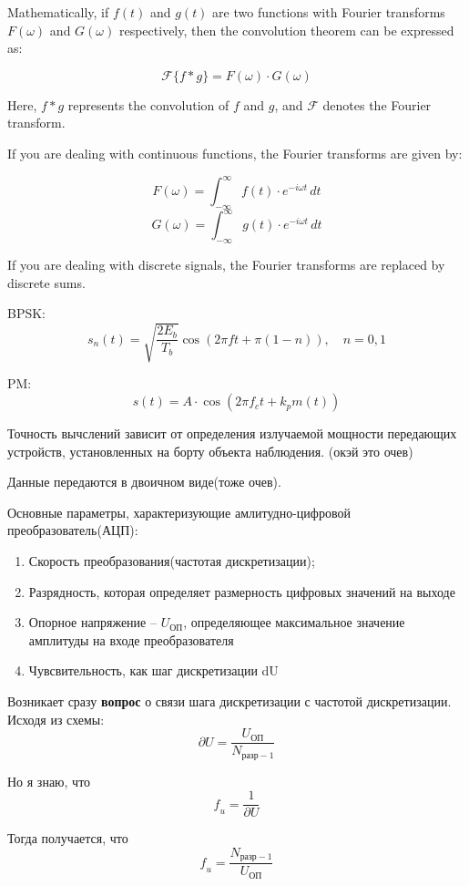 \documentclass[14pt, report]{extarticle}
\begin{document}
Mathematically, if \( f(t) \) and \( g(t) \) are two functions with Fourier transforms \( F(\omega) \) and \( G(\omega) \) respectively, then the convolution theorem can be expressed as:

\[ \mathcal{F}\{f * g\} = F(\omega) \cdot G(\omega) \]

Here, \( f * g \) represents the convolution of \( f \) and \( g \), and \( \mathcal{F} \) denotes the Fourier transform.

If you are dealing with continuous functions, the Fourier transforms are given by:

\[ F(\omega) = \int_{-\infty}^{\infty} f(t) \cdot e^{-i \omega t} \, dt \]
\[ G(\omega) = \int_{-\infty}^{\infty} g(t) \cdot e^{-i \omega t} \, dt \]

If you are dealing with discrete signals, the Fourier transforms are replaced by discrete sums.

\newpage

\par BPSK:
\[
s_{n}(t) = \sqrt{\frac{2E_{b}}{T_{b}}} \cos\left(2\pi ft + \pi(1-n)\right), \quad n=0,1
\]

\par PM:
\[
s(t) = A \cdot \cos(2\pi f_c t + k_p m(t))
\]

\newpage


Точность вычслений зависит от определения излучаемой мощности передающих устройств, установленных на борту объекта наблюдения. (окэй это очев)

\par Данные передаются в двоичном виде(тоже очев).

\par Основные параметры, характеризующие 
амлитудно-цифровой преобразователь(АЦП):

\begin{enumerate}
  \item Скорость преобразования(частотая дискретизации);
  \item Разрядность, которая определяет размерность цифровых значений на выходе
  \item Опорное напряжение -- $U_{\text{ОП}}$, определяющее максимальное значение амплитуды на входе преобразователя
  \item Чувсвительность, как шаг дискретизации dU 
\end{enumerate}

Возникает сразу \textbf{вопрос} о связи шага дискретизации с частотой дискретизации. Исходя из схемы:
$$
\partial U = \frac{U_{\text{ОП}}}{N_{\text{разр} - 1}}
$$
\par Но я знаю, что 
$$
\mathit{f_u} = \frac{1}{\partial U} 
$$
\par Тогда получается, что 
$$
\mathit{f_u} = \frac{N_{\text{разр} - 1}}{U_{\text{ОП}}}
$$
\end{document}
